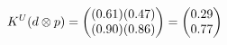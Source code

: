\documentclass[preview]{standalone}
\begin{document}
\begin{align*}
\special{dvisvgm:raw <g id='unique000'>}K^U(d \otimes p) = \begin{pmatrix} (0.61)(0.47) \\ (0.90)(0.86) \end{pmatrix} = \begin{pmatrix} 0.29 \\ 0.77 \end{pmatrix}\special{dvisvgm:raw </g>}
\end{align*}
\end{document}
